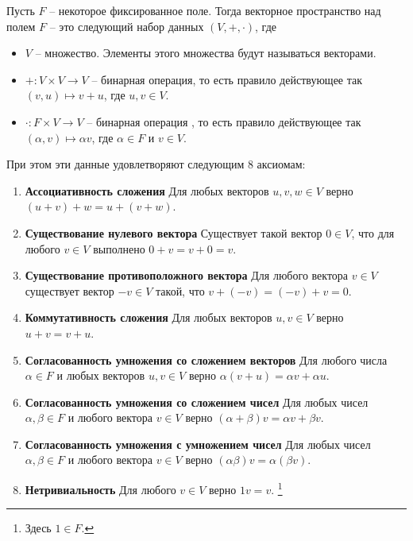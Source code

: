 \begin{definition}\label{def::VectorSpace}
Пусть $F$ -- некоторое фиксированное поле.
Тогда векторное пространство над полем $F$ -- это следующий набор данных $(V, +, \cdot)$, где
\begin{itemize}
\item $V$ -- множество.
Элементы этого множества будут называться векторами.

\item $+\colon V \times V \to V$ -- бинарная операция, то есть правило действующее так $(v,u)\mapsto v + u$, где $u,v \in V$.

\item $\cdot \colon F \times V \to V$ -- бинарная операция , то есть правило действующее так $(\alpha, v)\mapsto \alpha v$, где $\alpha \in F$ и $v\in V$.
\end{itemize}
При этом эти данные удовлетворяют следующим $8$ аксиомам:
\begin{enumerate}
\item {\bf Ассоциативность сложения} Для любых векторов $u,v,w\in V$ верно $(u+v) + w = u + (v+w)$.

\item {\bf Существование нулевого вектора} Существует такой вектор $0\in V$, что для любого $v\in V$ выполнено $0 + v = v + 0 = v$.

\item {\bf Существование противоположного вектора} Для любого вектора $v\in V$ существует вектор $-v\in V$ такой, что $v + (-v) = (-v) + v = 0$.

\item {\bf Коммутативность сложения} Для любых векторов $u,v \in V$ верно $u + v = v + u$.

\item {\bf Согласованность умножения со сложением векторов} Для любого числа $\alpha \in F$ и любых векторов $u,v \in V$ верно $\alpha(v + u) = \alpha v + \alpha u$.

\item {\bf Согласованность умножения со сложением чисел} Для любых чисел $\alpha, \beta\in F$ и любого вектора $v\in V$ верно $(\alpha + \beta)v = \alpha v + \beta v$.

\item {\bf Согласованность умножения с умножением чисел} Для любых чисел $\alpha,\beta\in F$ и любого вектора $v\in V$ верно $(\alpha\beta)v = \alpha(\beta v)$.

\item {\bf Нетривиальность} Для любого $v\in V$ верно $1 v = v$.%
\footnote{Здесь $1\in F$.}
\end{enumerate}
\end{definition}

